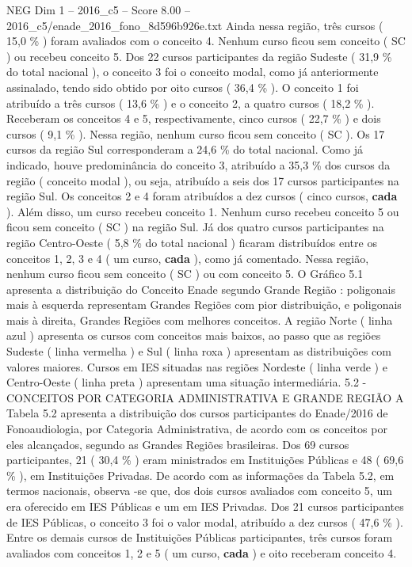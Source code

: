 \begin{textsample}{NEG Dim 1 – 2016\_c5 – Score 8.00 – 2016\_c5/enade\_2016\_fono\_8d596b926e.txt}
Ainda nessa região, três cursos ( 15,0 \% ) foram avaliados com o conceito 4.
Nenhum curso ficou sem conceito ( SC ) ou recebeu conceito 5.
Dos 22 cursos participantes da região Sudeste ( 31,9 \% do total nacional ), o conceito 3 foi o conceito modal, como já anteriormente assinalado, tendo sido obtido por oito cursos ( 36,4 \% ).
O conceito 1 foi atribuído a três cursos ( 13,6 \% ) e o conceito 2, a quatro cursos ( 18,2 \% ).
Receberam os conceitos 4 e 5, respectivamente, cinco cursos ( 22,7 \% ) e dois cursos ( 9,1 \% ).
Nessa região, nenhum curso ficou sem conceito ( SC ).
Os 17 cursos da região Sul corresponderam a 24,6 \% do total nacional.
Como já indicado, houve predominância do conceito 3, atribuído a 35,3 \% dos cursos da região ( conceito modal ), ou seja, atribuído a seis dos 17 cursos participantes na região Sul.
Os conceitos 2 e 4 foram atribuídos a dez cursos ( cinco cursos, \textbf{cada} ).
Além disso, um curso recebeu conceito 1.
Nenhum curso recebeu conceito 5 ou ficou sem conceito ( SC ) na região Sul.
Já dos quatro cursos participantes na região Centro-Oeste ( 5,8 \% do total nacional ) ficaram distribuídos entre os conceitos 1, 2, 3 e 4 ( um curso, \textbf{cada} ), como já comentado.
Nessa região, nenhum curso ficou sem conceito ( SC ) ou com conceito 5.
O Gráfico 5.1 apresenta a distribuição do Conceito Enade segundo Grande Região : poligonais mais à esquerda representam Grandes Regiões com pior distribuição, e poligonais mais à direita, Grandes Regiões com melhores conceitos.
A região Norte ( linha azul ) apresenta os cursos com conceitos mais baixos, ao passo que as regiões Sudeste ( linha vermelha ) e Sul ( linha roxa ) apresentam as distribuições com valores maiores.
Cursos em IES situadas nas regiões Nordeste ( linha verde ) e Centro-Oeste ( linha preta ) apresentam uma situação intermediária. 5.2 - CONCEITOS POR CATEGORIA ADMINISTRATIVA E GRANDE REGIÃO A Tabela 5.2 apresenta a distribuição dos cursos participantes do Enade/2016 de Fonoaudiologia, por Categoria Administrativa, de acordo com os conceitos por eles alcançados, segundo as Grandes Regiões brasileiras.
Dos 69 cursos participantes, 21 ( 30,4 \% ) eram ministrados em Instituições Públicas e 48 ( 69,6 \% ), em Instituições Privadas.
De acordo com as informações da Tabela 5.2, em termos nacionais, observa -se que, dos dois cursos avaliados com conceito 5, um era oferecido em IES Públicas e um em IES Privadas.
Dos 21 cursos participantes de IES Públicas, o conceito 3 foi o valor modal, atribuído a dez cursos ( 47,6 \% ).
Entre os demais cursos de Instituições Públicas participantes, três cursos foram avaliados com conceitos 1, 2 e 5 ( um curso, \textbf{cada} ) e oito receberam conceito 4.

\end{textsample}

